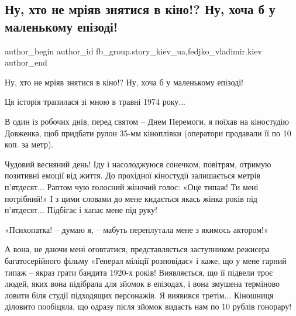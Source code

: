  
 
 
 
 
 
\subsection{Ну, хто не мріяв знятися в кіно!? Ну, хоча б у маленькому епізоді!}
\label{sec:17_11_2021.fb.fb_group.story_kiev_ua.1.kino}
 
\ifcmt
 author_begin
   author_id fb_group.story_kiev_ua,fedjko_vladimir.kiev
 author_end
\fi

Ну, хто не мріяв знятися в кіно!? Ну, хоча б у маленькому епізоді! 

Ця історія трапилася зі мною в травні 1974 року...

В один із робочих днів, перед святом – Днем Перемоги, я поїхав на кіностудію
Довженка, щоб придбати рулон 35-мм кіноплівки (оператори продавали її по 10
коп. за метр).


Чудовий весняний день! Іду і насолоджуюся сонечком, повітрям, отримую позитивні
емоції від життя. До прохідної кіностудії залишається метрів п’ятдесят... Раптом
чую голосний жіночий голос: «Оце типаж! Ти мені потрібний!» І з цими словами до
мене кидається якась жінка років під п’ятдесят... Підбігає і хапає мене під руку!

«Психопатка! – думаю я, – мабуть переплутала мене з якимось актором!»

А вона, не даючи мені оговтатися, представляється заступником режисера
багатосерійного фільму «Генерал міліції розповідає» і каже, що у мене гарний
типаж – якраз грати бандита 1920-х років! Виявляється, що її підвели троє
людей, яких вона підібрала для зйомок в епізодах, і вона змушена терміново
ловити біля студії підходящих персонажів. Я виявився третім... Кіношниця діловито
пообіцяла, що одразу після зйомок видасть нам по 10 рублів гонорару!

